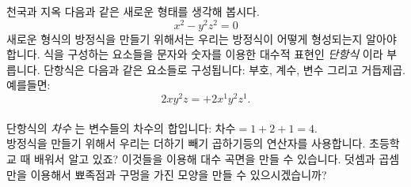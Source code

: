 \begin{surferPage}{천국과 지옥}
다음과 같은 새로운 형태를 생각해 봅시다. \\
\smallskip
\[x^2	- y^2z^2	= 0\]
\singlespacing
새로운 형식의 방정식을 만들기 위해서는 우리는 방정식이 어떻게 형성되는지 알아야 합니다. 식을 구성하는 요소들을 문자와 숫자를 이용한 대수적 표현인 {\it 단항식} 이라 부릅니다.
\singlespacing
단항식은 다음과 같은 요소들로 구성됩니다:
부호, 계수, 변수 그리고 거듭제곱. \\
\singlespacing
예를들면: 
\smallskip
\[2xy^2z = +2x^1y^2z^1.\]
\\
\smallskip
단항식의 {\it 차수} 는 변수들의 차수의 합입니다: $차수 = 1+2+1=4$.  \\
\singlespacing
방정식을 만들기 위해서 우리는 더하기 빼기 곱하기등의 연산자를 사용합니다. 초등학교 때 배워서 알고 있죠? 이것들을 이용해 대수 곡면을 만들 수 있습니다.   
\singlespacing
덧셈과 곱셈만을 이용해서 뾰족점과 구멍을 가진 모양을 만들 수 있으시겠습니까?
\end{surferPage}
